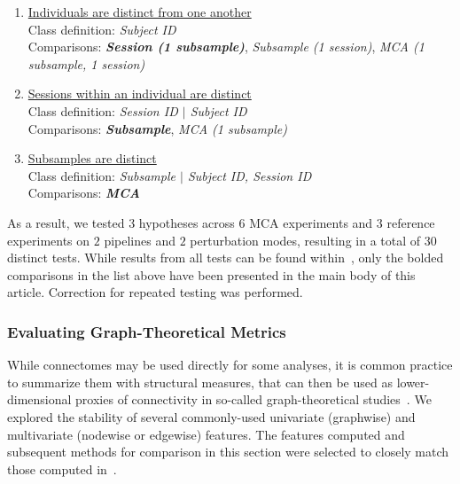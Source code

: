 \documentclass[fleqn,10pt]{SelfArx} %
\newcommand{\new}[1]{{#1}}
\begin{document}
\begin{enumerate}[label=$H_{A\arabic*}$:]
\item \underline{Individuals are distinct from one another}\\
Class definition: \textit{Subject ID}\\
Comparisons: \textbf{\textit{Session (1 subsample)}}, \textit{Subsample (1 session)},
\textit{MCA (1 subsample, 1 session)}
\item \underline{Sessions within an individual are distinct}\\
Class definition: \textit{Session ID $\vert$ Subject ID}\\
Comparisons: \textbf{\textit{Subsample}}, \textit{MCA (1 subsample)}
\item \underline{Subsamples are distinct}\\
Class definition: \textit{Subsample $\vert$ Subject ID, Session ID}\\
Comparisons: \textbf{\textit{MCA}}
\end{enumerate}

As a result, we tested $3$ hypotheses across $6$ MCA experiments and $3$ reference experiments on $2$ pipelines and $2$
perturbation modes, resulting in a total of $30$ distinct tests. \new{While results from all tests can be found
within~\sref{supsec:discrimfull}, only the bolded comparisons in the list above have been presented in the main body of
this article. Correction for repeated testing was performed.}

\subsubsection*{Evaluating Graph-Theoretical Metrics}
While connectomes may be used directly for some analyses, it is common practice to summarize them with structural
measures, that can then be used as lower-dimensional proxies of connectivity in so-called graph-theoretical
studies~\cite{Rubinov2010-fh}. We explored the stability of several commonly-used univariate (graphwise) and
multivariate (nodewise or edgewise) features. The features computed and subsequent methods for comparison in this
section were selected to closely match those computed in~\cite{Betzel2018-eo}.
\end{document}
